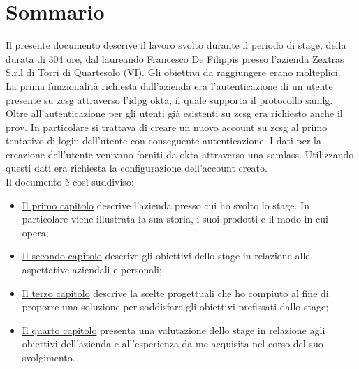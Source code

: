 
\cleardoublepage
{}
{}
\begingroup
\let\clearpage\relax
\let\cleardoublepage\relax
\let\cleardoublepage\relax

\chapter*{Sommario}

Il presente documento descrive il lavoro svolto durante il periodo di stage, della durata di 304 ore, dal laureando Francesco De Filippis presso l'azienda Zextras S.r.l di Torri di Quartesolo (VI).
Gli obiettivi da raggiungere erano molteplici.\\
La prima funzionalità richiesta dall'azienda era l'autenticazione di un utente presente su \gls{zcsg} attraverso l'\gls{idpg} \gls{okta}, il quale supporta il protocollo \gls{samlg}.
Oltre all'autenticazione per gli utenti già esistenti su \gls{zcsg} era richiesto anche il \gls{prov}. In particolare si trattava di creare un nuovo account su \gls{zcsg} al primo tentativo di login dell'utente con conseguente autenticazione. I dati per la creazione dell'utente venivano forniti da \gls{okta} attraverso una \gls{samlass}. Utilizzando questi dati era richiesta la configurazione dell'account creato.\\
Il documento è così suddiviso:
\begin{itemize}
    \item \hyperref[cap:azienda]{Il primo capitolo} descrive l'azienda presso cui ho svolto lo stage. In particolare viene illustrata la sua storia, i suoi prodotti e il modo in cui opera;
    \item \hyperref[cap:obiettivi]{Il secondo capitolo} descrive gli obiettivi dello stage
    in relazione alle aspettative aziendali e personali;
    \item \hyperref[cap:resoconto]{Il terzo capitolo} descrive la scelte progettuali che ho compiuto al fine di proporre una soluzione per soddisfare gli obiettivi prefissati dallo stage;
    \item \hyperref[cap:retrospettiva]{Il quarto capitolo} presenta una valutazione dello stage in relazione agli obiettivi dell'azienda e all'esperienza da me acquisita nel corso del suo svolgimento.
\end{itemize}

%
%

\endgroup			

\vfill

